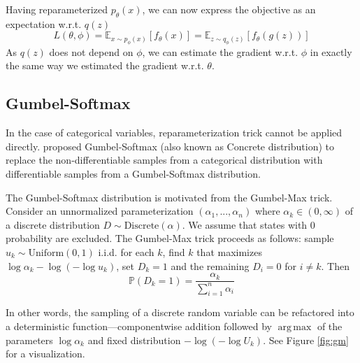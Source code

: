 \documentclass[11pt,a4paper]{article}
\DeclareMathOperator*{\argmax}{arg\,max}
\begin{document}
Having reparameterized $p_\theta(x)$, we can now express the objective as an expectation w.r.t. $q(z)$
\begin{equation}
   L(\theta, \phi) = \mathbb{E}_{x \sim p_\phi(x)}[f_\theta(x)] = \mathbb{E}_{z \sim q_\phi(z)}[f_\theta(g(z))]
\end{equation}
As $q(z)$ does not depend on $\phi$, we can estimate the gradient w.r.t. $\phi$ in exactly the same way we estimated the gradient w.r.t. $\theta$.


\subsection{Gumbel-Softmax}
In the case of categorical variables, reparameterization trick cannot be applied directly. \citet{maddison2016concrete, jang2016categorical} proposed Gumbel-Softmax (also known as Concrete distribution) to replace the non-differentiable samples from a categorical distribution with differentiable samples from a Gumbel-Softmax distribution.

The Gumbel-Softmax distribution is motivated from the Gumbel-Max trick. Consider an unnormalized parameterization $(\alpha_1,...,\alpha_n)$ where $\alpha_k \in (0,\infty)$ of a discrete distribution $D \sim \text{Discrete}(\alpha)$. We assume that states with 0 probability are excluded. The Gumbel-Max trick proceeds as follows: sample $u_k \sim \text{Uniform}(0, 1)$ i.i.d. for each $k$, find $k$ that maximizes ${\log\alpha_k -\log(-\log u_k)}$, set $D_k = 1$ and the remaining $D_i = 0$ for $i \neq k$. Then
\begin{equation}
    \mathbb{P}(D_k = 1) = \frac{\alpha_k}{\sum_{i=1}^{n}\alpha_i}
\end{equation}

In other words, the sampling of a discrete random variable can be refactored into a deterministic  function---componentwise addition followed by $\argmax$ of the parameters $\log \alpha_k$ and fixed distribution $-\log(-\log U_k)$. See Figure \ref{fig:gm} for a visualization.
\end{document}
